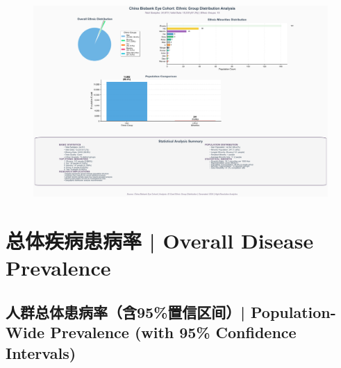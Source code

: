 \documentclass[12pt,a4paper]{article}
\begin{document}
\begin{figure}[H]
\hspace*{-2cm}
\includegraphics[width=1.2\textwidth]{ID/comprehensive_ethnic_analysis_optimized.png}
\end{figure}








\section{总体疾病患病率 | Overall Disease Prevalence}

\subsection{人群总体患病率（含95\%置信区间）| Population-Wide Prevalence (with 95\% Confidence Intervals)}
\end{document}
